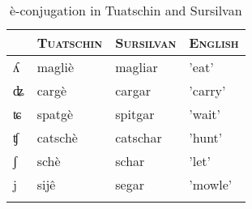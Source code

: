 \begin{table}
\caption{è-conjugation in Tuatschin and Sursilvan}
\label{tab:èconj}
 \begin{tabular}{llll} %
 \lsptoprule
&\textsc{Tuatschin}  & \textsc{Sursilvan}  & \textsc{English} \\
  \midrule
 ʎ & magliè &magliar& 'eat' \\
ʥ&cargè&cargar&'carry'\\
ʨ&spatgè&spitgar&'wait'\\
ʧ&catschè&catschar&'hunt'\\
ʃ&schè&schar&'let'\\
j&sijê&segar&'mowle'\\   
 \lspbottomrule
 \end{tabular}
\end{table}


